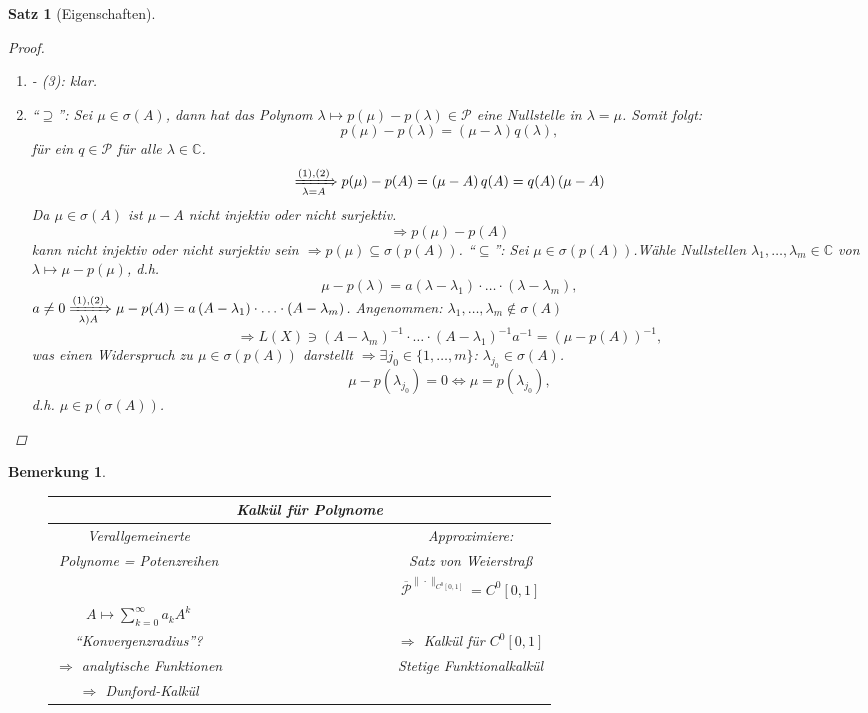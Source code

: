 \documentclass[12pt]{extreport} %
\newcommand{\C}{\mathbb{C}}
\theoremstyle{named}
\theoremstyle{nnamed}
\theoremstyle{itshape}
\theoremstyle{normal}
\newtheorem*{satz}{Satz}
\newtheorem*{bemerkung}{Bemerkung}
\begin{document}
\begin{satz}[Eigenschaften]
	\begin{proof} ~\
		\begin{enumerate}[label=\upshape(\arabic*\upshape)]
			\item - (3): klar.  \setcounter{enumi}{3}
			\item \enquote{$\supseteq$}: Sei $\mu \in \sigma(A)$, dann hat das Polynom $\lambda \mapsto p(\mu)- p(\lambda) \in \mathcal{P}$ eine Nullstelle in $\lambda = \mu$. Somit folgt:
					$$ p(\mu) - p(\lambda) = \left( \mu - \lambda \right) q(\lambda), $$
				für ein $q \in \mathcal{P}$ für alle $\lambda \in \C$.
					$$ \xRightarrow[\lambda = A]{(1), (2)} p(\mu) - p(A) = \left( \mu - A \right) q(A) = q(A) \left( \mu - A \right) $$
				Da $\mu \in \sigma(A)$ ist $\mu - A$ nicht injektiv oder nicht surjektiv.
					$$ \Rightarrow p(\mu) - p(A) $$
				kann nicht injektiv oder nicht surjektiv sein $\Rightarrow p(\mu) \subseteq \sigma \left( p(A) \right)$. \bigskip
				\enquote{$\subseteq$}: Sei $\mu \in \sigma \left( p (A) \right)$.Wähle Nullstellen $\lambda_1, \dotsc, \lambda_m \in \C$ von $\lambda \mapsto \mu - p(\mu)$, d.h.
				$$ \mu - p(\lambda) = a \left( \lambda - \lambda_1 \right) \cdot \dotsc \cdot \left( \lambda - \lambda_m \right), $$
				$a \neq 0 \xRightarrow[\lambda ) A]{(1), (2)} \mu - p(A) = a \left(A - \lambda_1 \right) \cdot \dotsc \cdot \left(A - \lambda_m \right)$. Angenommen: $\lambda_1, \dotsc, \lambda_m \notin \sigma(A)$
				$$ \Rightarrow L(X) \ni \left(A - \lambda_m \right)^{-1} \cdot \dotsc \cdot \left( A - \lambda_1 \right)^{-1} a^{-1} = \left( \mu - p(A) \right)^{-1}, $$
				was einen Widerspruch zu $\mu \in \sigma \left( p(A) \right)$ darstellt $\Rightarrow \exists j_0 \in \{1, \dotsc, m \}$: $\lambda_{j_0} \in \sigma(A)$.
				$$ \mu - p(\lambda_{j_0}) = 0 \iff \mu = p(\lambda_{j_0}), $$
				d.h. $\mu \in p \left( \sigma(A) \right)$.
		\end{enumerate}
	\end{proof}
\end{satz}

\begin{bemerkung} ~\\
	\begin{figure*}[h!] \centering
		\begin{tabular}{ccc}
  			~ & \textbf{Kalkül für Polynome} & ~ \\
  			\hline
  			Verallgemeinerte & & Approximiere: \\
  			Polynome = Potenzreihen & & Satz von Weierstraß \\
  			& ~ & $\overline{\mathcal{P}}^{\|\cdot\|_{C^{0}[0,1]}} = C^{0}[0,1]$ \\
  			$A \mapsto \sum_{k =0}^{\infty} a_k A^k$ & ~ & ~ \\
 			\enquote{Konvergenzradius}? & ~ & $\Rightarrow$ Kalkül für $C^0[0,1]$  \\
  			$\Rightarrow$ analytische Funktionen   & ~ & Stetige Funktionalkalkül \\
  			$\Rightarrow$ Dunford-Kalkül & ~ & ~ 
		\end{tabular}
	\end{figure*}
\end{bemerkung}
\end{document}
